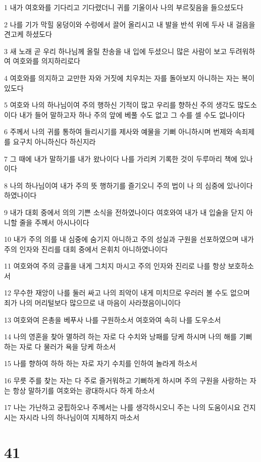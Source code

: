 \par 1 내가 여호와를 기다리고 기다렸더니 귀를 기울이사 나의 부르짖음을 들으셨도다
\par 2 나를 기가 막힐 웅덩이와 수렁에서 끌어 올리시고 내 발을 반석 위에 두사 내 걸음을 견고케 하셨도다
\par 3 새 노래 곧 우리 하나님께 올릴 찬송을 내 입에 두셨으니 많은 사람이 보고 두려워하여 여호와를 의지하리로다
\par 4 여호와를 의지하고 교만한 자와 거짓에 치우치는 자를 돌아보지 아니하는 자는 복이 있도다
\par 5 여호와 나의 하나님이여 주의 행하신 기적이 많고 우리를 향하신 주의 생각도 많도소이다 내가 들어 말하고자 하나 주의 앞에 베풀 수도 없고 그 수를 셀 수도 없나이다
\par 6 주께서 나의 귀를 통하여 들리시기를 제사와 예물을 기뻐 아니하시며 번제와 속죄제를 요구치 아니하신다 하신지라
\par 7 그 때에 내가 말하기를 내가 왔나이다 나를 가리켜 기록한 것이 두루마리 책에 있나이다
\par 8 나의 하나님이여 내가 주의 뜻 행하기를 즐기오니 주의 법이 나 의 심중에 있나이다 하였나이다
\par 9 내가 대회 중에서 의의 기쁜 소식을 전하였나이다 여호와여 내가 내 입술을 닫지 아니할 줄을 주께서 아시나이다
\par 10 내가 주의 의를 내 심중에 숨기지 아니하고 주의 성실과 구원을 선포하였으며 내가 주의 인자와 진리를 대회 중에서 은휘치 아니하였나이다
\par 11 여호와여 주의 긍휼을 내게 그치지 마시고 주의 인자와 진리로 나를 항상 보호하소서
\par 12 무수한 재앙이 나를 둘러 싸고 나의 죄악이 내게 미치므로 우러러 볼 수도 없으며 죄가 나의 머리털보다 많으므로 내 마음이 사라졌음이니이다
\par 13 여호와여 은총을 베푸사 나를 구원하소서 여호와여 속히 나를 도우소서
\par 14 나의 영혼을 찾아 멸하려 하는 자로 다 수치와 낭패를 당케 하시며 나의 해를 기뻐하는 자로 다 물러가 욕을 당케 하소서
\par 15 나를 향하여 하하 하는 자로 자기 수치를 인하여 놀라게 하소서
\par 16 무릇 주를 찾는 자는 다 주로 즐거워하고 기뻐하게 하시며 주의 구원을 사랑하는 자는 항상 말하기를 여호와는 광대하시다 하게 하소서
\par 17 나는 가난하고 궁핍하오나 주께서는 나를 생각하시오니 주는 나의 도움이시요 건지시는 자시라 나의 하나님이여 지체하지 마소서

\chapter{41}

